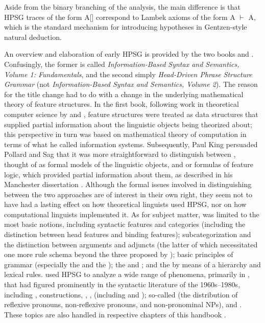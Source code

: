 \documentclass[output=paper
 	        ,biblatex
                ,babelshorthands
                ,newtxmath
                ,draftmode
                ,colorlinks, citecolor=brown
]{langscibook}
\begin{document}
\noindent
Aside from the binary branching of the \citeauthor{Lambek1958} analysis, the main difference is that HPSG traces of
the form A[\slasch {}] correspond
to Lambek axioms of the form A $\vdash$ A, which is the standard mechanism for introducing hypotheses in Gentzen-style natural deduction.

An overview and elaboration of early HPSG is provided by the two books \citet{ps} and \citet{ps2}. Confusingly, the former is called \textit{Information-Based Syntax and Semantics, Volume 1: Fundamentals}, and the second simply \textit{Head-Driven Phrase Structure Grammar} (not \textit{Information-Based Syntax and Semantics, Volume 2}). The reason for the title change had to do with a change in the underlying mathematical theory of feature structures. In the first book, following work in theoretical computer science by \citet{RoundsKasper1986} and \citet{MoshierRounds1987}, feature structures were treated as data structures that supplied partial information about the linguistic objects being theorized about; this perspective in turn was based on  mathematical theory of computation in terms of what he called information systems. Subsequently, Paul King persuaded Pollard and Sag that it was more straightforward to distinguish between , thought of as formal models of the linguistic objects, and  or formulas of feature logic, which provided partial information about them, as described in his Manchester dissertation \citep{King89}.  Although the formal issues involved in distinguishing between the two approaches are of interest in their own right, they seem not to have had a lasting effect on how theoretical linguists used HPSG, nor on how computational linguists implemented it. As for subject matter, \citet{ps} was limited to the most basic notions, including syntactic features and categories (including the distinction between head features and binding features); subcategorization and the distinction between arguments and adjuncts (the latter of which necessitated one more rule schema beyond the three proposed by \citealt{Pollard85a-u}); basic principles of grammar (especially the  and the ); the  and ; and the  by means of a  hierarchy and lexical rules. \citet{ps2} used HPSG to analyze a wide range of phenomena, primarily in , that had figured prominently in the syntactic literature of the 1960s--1980s, including ,  constructions, , ,  (including  and ); so-called  (the distribution of reflexive pronouns, non-reflexive pronouns, and non-pronominal NPs), and . These topics are also handled in respective chapters of this handbook \parencites{chapters/agreement}{chapters/control-raising}{chapters/udc}{chapters/islands}{chapters/binding}[Section~\ref{sec-scope-in-hpsg}]{chapters/semantics}.
\end{document}
